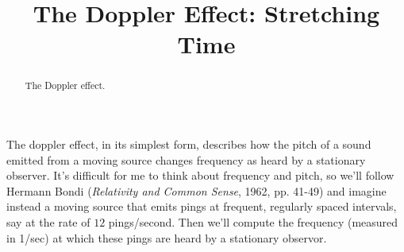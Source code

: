\documentclass{ximera}
\title{The Doppler Effect: Stretching Time}
\begin{document}
\begin{abstract}
The Doppler effect.
\end{abstract}
\maketitle

The doppler effect, in its simplest form, describes how the pitch of a sound emitted from a moving source changes frequency as heard by a stationary observer. It's difficult for me to think about frequency and pitch, so we'll follow Hermann Bondi (\emph{Relativity and Common Sense}, 1962, pp. 41-49) and imagine instead a moving source that emits pings at frequent, regularly spaced intervals, say at the rate of $12$ pings/second. Then we'll compute the frequency (measured in 1/sec) at which these pings are heard by a stationary observor.
\end{document}
